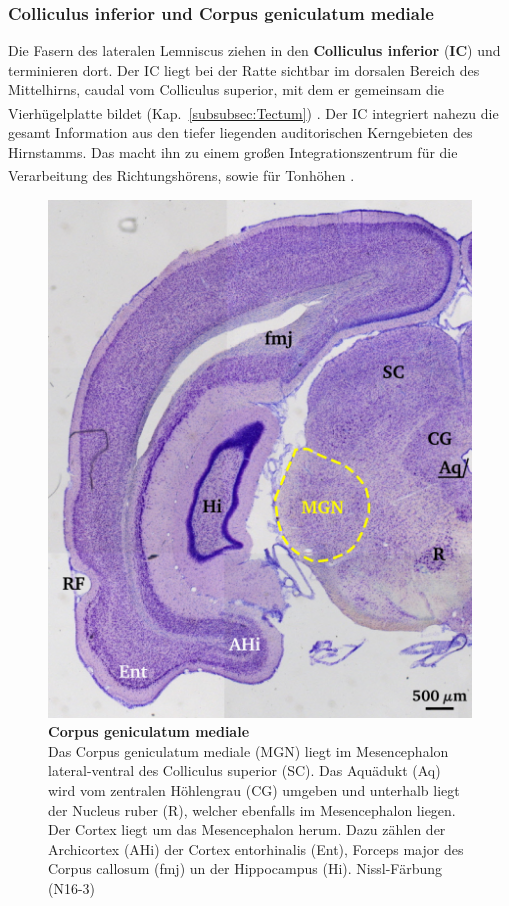 \documentclass[12pt,a4paper,pdftex]{article}
\begin{document}
\newpage
\subsubsection*{Colliculus inferior und Corpus geniculatum mediale}

Die Fasern des lateralen Lemniscus ziehen in den \textbf{Colliculus inferior} (\textbf{IC})  und terminieren dort. Der IC liegt bei der Ratte sichtbar im dorsalen Bereich des Mittelhirns, caudal vom Colliculus superior, mit dem er gemeinsam die Vierhügelplatte bildet (Kap.~\ref{subsubsec:Tectum}) \textsuperscript{\cite[29]{paxinos2014rat}}. 
Der IC integriert nahezu die gesamt Information aus den tiefer liegenden auditorischen Kerngebieten des Hirnstamms. Das macht ihn zu einem großen Integrationszentrum für die Verarbeitung des Richtungshörens, sowie für Tonhöhen \textsuperscript{\cite[29]{paxinos2014rat}}.

\begin{figure}[H]
    \centering
    \includegraphics{pictures/auditory/MG.png}
    \caption[Corpus geniculatum mediale]{\textbf{Corpus geniculatum mediale}\\
    Das Corpus geniculatum mediale (MGN) liegt im Mesencephalon lateral-ventral des Colliculus superior (SC). Das Aquädukt (Aq) wird vom zentralen Höhlengrau (CG) umgeben und unterhalb liegt der Nucleus ruber (R), welcher ebenfalls im Mesencephalon liegen. Der Cortex liegt um das Mesencephalon herum. Dazu zählen der Archicortex (AHi) der Cortex entorhinalis (Ent), Forceps major des Corpus callosum (fmj) un der Hippocampus (Hi). Nissl-Färbung (N16-3)}
    \label{fig:MG}
\end{figure}
\end{document}
